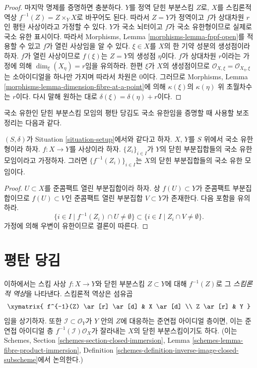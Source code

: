 \begin{proof}
마지막 명제를 증명하면 충분하다.
$Y$를 정역 닫힌 부분스킴 $Z$로, $X$를 스킴론적 역상
$f^{-1}(Z) = Z \times_Y X$로 바꾸어도 된다. 따라서 $Z = Y$가 정역이고
$f$가 상대차원 $r$인 평탄 사상이라고 가정할 수 있다. $Y$가 국소
뇌터이고 $f$가 국소 유한형이므로 실제로 국소 유한 표시이다.
따라서 Morphisms, Lemma \ref{morphisms-lemma-fppf-open}를 적용할 수 있고
$f$가 열린 사상임을 알 수 있다. $\xi \in X$를 $X$의 한 기약 성분의
생성점이라 하자. $f$가 열린 사상이므로 $f(\xi)$는 $Z = Y$의 생성점
$\eta$이다. $f$가 상대차원 $r$이라는 가정에 의해
$\dim_\xi(X_\eta) = r$임을 유의하라. 한편 $\xi$가 $X$의 생성점이므로
$\mathcal{O}_{X, \xi} = \mathcal{O}_{X_\eta, \xi}$는 소아이디얼을 하나만
가지며 따라서 차원은 $0$이다. 그러므로 Morphisms, Lemma
\ref{morphisms-lemma-dimension-fibre-at-a-point}에 의해 $\kappa(\xi)$의
$\kappa(\eta)$ 위 초월차수는 $r$이다. 다시 말해 원하는 대로
$\delta(\xi) = \delta(\eta) + r$이다.
\end{proof}

\noindent
국소 유한인 닫힌 부분스킴 모임의 평탄 당김도 국소 유한임을 증명할 때
사용할 보조정리는 다음과 같다.

\begin{lemma}
\label{lemma-inverse-image-locally-finite}
$(S, \delta)$가 Situation \ref{situation-setup}에서와 같다고 하자.
$X$, $Y$를 $S$ 위에서 국소 유한형이라 하자.
$f : X \to Y$를 사상이라 하자.
$\{Z_i\}_{i \in I}$가 $Y$의 닫힌 부분집합들의 국소 유한 모임이라고
가정하자. 그러면 $\{f^{-1}(Z_i)\}_{i \in I}$는 $X$의 닫힌 부분집합들의
국소 유한 모임이다.
\end{lemma}

\begin{proof}
$U \subset X$를 준콤팩트 열린 부분집합이라 하자. 상 $f(U) \subset Y$가
준콤팩트 부분집합이므로 $f(U) \subset V$인 준콤팩트 열린 부분집합
$V \subset Y$가 존재한다. 다음 포함을 유의하라.
$$
\{i \in I \mid f^{-1}(Z_i) \cap U \not = \emptyset \}
\subset
\{i \in I \mid Z_i \cap V \not = \emptyset \}.
$$
가정에 의해 우변이 유한이므로 결론이 따른다.
\end{proof}



\section{평탄 당김}
\label{section-flat-pullback}

\noindent
이하에서는 스킴 사상 $f : X \to Y$와 닫힌 부분스킴 $Z \subset Y$에
대해 $f^{-1}(Z)$로 그 {\it 스킴론적 역상}을 나타낸다. 스킴론적 역상은
섬유곱
$$
\xymatrix{
f^{-1}(Z) \ar[r] \ar[d] & X \ar[d] \\
Z \ar[r] & Y
}
$$
임을 상기하자. 또한 $\mathcal{I} \subset \mathcal{O}_Y$가 $Y$ 안의
$Z$에 대응하는 준연접 아이디얼 층이면, 이는 준연접 아이디얼 층
$f^{-1}(\mathcal{I})\mathcal{O}_X$가 잘라내는 $X$의 닫힌 부분스킴이기도
하다. (이는 Schemes, Section \ref{schemes-section-closed-immersion},
Lemma \ref{schemes-lemma-fibre-product-immersion}, Definition
\ref{schemes-definition-inverse-image-closed-subscheme}에서 논의한다.)

